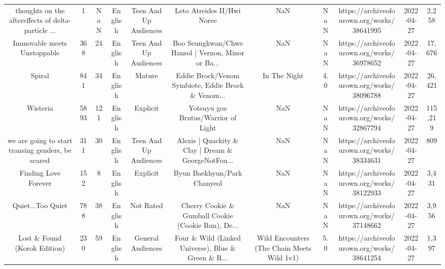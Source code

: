 \begin{table}[h!]
{\begin{tabular}{|c|c|c|c|c|c|c|c|c|c|c|}
thoughts on the aftereffects of delta-particle ... &      1 &   NaN &  English & Teen And Up Audiences &                         Leto Atreides II/Hwi Noree &                                                NaN &   NaN & https://archiveofourown.org/works/38641995 & 2022-04-27 &     2,258 \\
                       Immovable meets Unstoppable &    368 &    24 &  English & Teen And Up Audiences & Boo Seungkwan/Chwe Hansol | Vernon, Minor or Ba... &                                                NaN &   NaN & https://archiveofourown.org/works/36978652 & 2022-04-27 &    17,676 \\
                                            Spiral &    841 &    34 &  English &                Mature & Eddie Brock/Venom Symbiote, Eddie Brock \& Venom... &                                       In The Night &   4.0 & https://archiveofourown.org/works/38096788 & 2022-04-27 &    26,421 \\
                                          Wisteria &   5893 &   121 &  English &              Explicit &                Yotsuyu goe Brutus/Warrior of Light &                                                NaN &   NaN & https://archiveofourown.org/works/32867794 & 2022-04-27 &   115,219 \\
 we are going to start transing genders, be scared &    311 &    30 &  English & Teen And Up Audiences & Alexis | Quackity \& Clay | Dream \& GeorgeNotFou... &                                                NaN &   NaN & https://archiveofourown.org/works/38334631 & 2022-04-27 &       809 \\
                              Finding Love Forever &    152 &     8 &  English &              Explicit &                        Byun Baekhyun/Park Chanyeol &                                                NaN &   NaN & https://archiveofourown.org/works/38122933 & 2022-04-27 &     3,431 \\
                                 Quiet...Too Quiet &    788 &    38 &  English &             Not Rated & Cherry Cookie \& Gumball Cookie (Cookie Run), De... &                                                NaN &   NaN & https://archiveofourown.org/works/37148662 & 2022-04-27 &     3,956 \\
                      Lost \& Found (Korok Edition) &    230 &    59 &  English &     General Audiences & Four \& Wild (Linked Universe), Blue \& Green \& R... &         Wild Encounters (The Chain Meets Wild 1v1) &   5.0 & https://archiveofourown.org/works/38641254 & 2022-04-27 &     1,397 \\

\end{tabular}}
\end{table}

